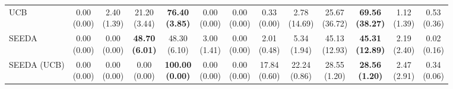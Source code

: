 \begin{table}[H]
{\begin{tabular}{l|cccccc|cccccc}
UCB & \makecell{0.00 \\ (0.00)} & \makecell{2.40 \\ (1.39)} & {\cellcolor[HTML]{C8E6C9}} \makecell{21.20 \\ (3.44)} & \bfseries \makecell{76.40 \\ (3.85)} & \makecell{0.00 \\ (0.00)} & \makecell{0.00 \\ (0.00)} & \makecell{0.33 \\ (0.00)} & \makecell{2.78 \\ (14.69)} & {\cellcolor[HTML]{C8E6C9}} \makecell{25.67 \\ (36.72)} & \bfseries \makecell{69.56 \\ (38.27)} & \makecell{1.12 \\ (1.39)} & \makecell{0.53 \\ (0.36)} \\
SEEDA & \makecell{0.00 \\ (0.00)} & \makecell{0.00 \\ (0.00)} & {\cellcolor[HTML]{C8E6C9}} \bfseries \makecell{48.70 \\ (6.01)} & \makecell{48.30 \\ (6.10)} & \makecell{3.00 \\ (1.41)} & \makecell{0.00 \\ (0.00)} & \makecell{2.01 \\ (0.48)} & \makecell{5.34 \\ (1.94)} & {\cellcolor[HTML]{C8E6C9}} \makecell{45.13 \\ (12.93)} & \bfseries \makecell{45.31 \\ (12.89)} & \makecell{2.19 \\ (2.40)} & \makecell{0.02 \\ (0.16)} \\
SEEDA (UCB) & \makecell{0.00 \\ (0.00)} & \makecell{0.00 \\ (0.00)} & {\cellcolor[HTML]{C8E6C9}} \makecell{0.00 \\ (0.00)} & \bfseries \makecell{100.00 \\ (0.00)} & \makecell{0.00 \\ (0.00)} & \makecell{0.00 \\ (0.00)} & \makecell{17.84 \\ (0.60)} & \makecell{22.24 \\ (0.86)} & {\cellcolor[HTML]{C8E6C9}} \makecell{28.55 \\ (1.20)} & \bfseries \makecell{28.56 \\ (1.20)} & \makecell{2.47 \\ (2.91)} & \makecell{0.34 \\ (0.06)} \\

\end{tabular}}
\end{table}
